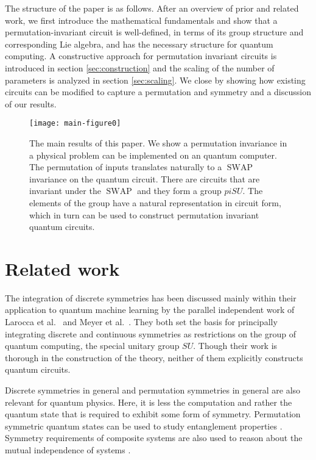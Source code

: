 \documentclass[%
 reprint,
 amsmath,amssymb,
 aps,
]{revtex4-2}
\newcommand{\SWAP}{\operatorname{SWAP}}
\theoremstyle{definition}%
\begin{document}
The structure of the paper is as follows. After an overview of prior and related work, we first introduce the mathematical fundamentals and show that a permutation-invariant circuit is well-defined, in terms of its group structure and corresponding Lie algebra, and has the necessary structure for quantum computing. A constructive approach for permutation invariant circuits is introduced in section \ref{sec:construction} and the scaling of the number of parameters is analyzed in section \ref{sec:scaling}. We close by showing how existing circuits can be modified to capture a permutation and symmetry and a discussion of our results.

\begin{figure*}
%
    \texttt{[image: main-figure0]}
    \caption{The main results of this paper. We show a permutation invariance in a physical problem can be implemented on an quantum computer. The permutation of inputs translates naturally to a $\SWAP$ invariance on the quantum circuit. There are circuits that are invariant under the $\SWAP$ and they form a group $piSU$. The elements of the group have a natural representation in circuit form, which in turn can be used to construct permutation invariant quantum circuits.}\label{fig:main-result}
\end{figure*}

\section{Related work}


The integration of discrete symmetries has been discussed mainly within their application to quantum machine learning by the parallel independent work of Larocca et al.~\cite{larocca_group-invariant_2022} and Meyer et al.~\cite{meyer_exploiting_2023}. They both set the basis for principally integrating discrete and continuous symmetries as restrictions on the group of quantum computing, the special unitary group $SU$. Though their work is thorough in the construction of the theory, neither of them explicitly constructs quantum circuits.

Discrete symmetries in general and permutation symmetries in general are also relevant for quantum physics. Here, it is less the computation and rather the quantum state that is required to exhibit some form of symmetry. Permutation symmetric quantum states can be used to study entanglement properties \cite{dur_three_2000, markham_entanglement_2011}. Symmetry requirements of composite systems are also used to reason about the mutual independence of systems \cite{renner_symmetry_2007}.
\end{document}
